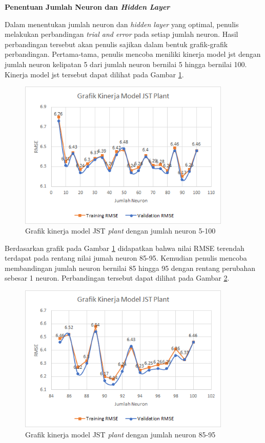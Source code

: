\noindent \textbf{Penentuan Jumlah Neuron dan \textit{Hidden Layer}}

Dalam menentukan jumlah neuron dan \textit{hidden layer} yang optimal, penulis melakukan perbandingan \textit{trial and error} pada setiap jumlah neuron. Hasil perbandingan tersebut akan penulis sajikan dalam bentuk grafik-grafik perbandingan. Pertama-tama, penulis mencoba meniliki kinerja model jst dengan jumlah neuron kelipatan 5 dari jumlah neuron bernilai 5 hingga bernilai 100. Kinerja model jst tersebut dapat dilihat pada Gambar \ref{fig:5:Neuron5-100}.
\begin{figure}[!h]
	\centering
	\includegraphics[width=0.9\textwidth]{figures/Neuron5-100}
	\caption{Grafik kinerja model JST \textit{plant} dengan jumlah neuron 5-100}
	\label{fig:5:Neuron5-100}
\end{figure}

Berdasarkan grafik pada Gambar \ref{fig:5:Neuron5-100} didapatkan bahwa nilai RMSE terendah terdapat pada rentang nilai jumah neuron 85-95. Kemudian penulis mencoba membandingan jumlah neuron bernilai 85 hingga 95 dengan rentang perubahan sebesar 1 neuron. Perbandingan tersebut dapat dilihat pada Gambar \ref{fig:5:Neuron85-95}.
\begin{figure}[!h]
	\centering
	\includegraphics[width=0.9\textwidth]{figures/Neuron85-95}
	\caption{Grafik kinerja model JST \textit{plant} dengan jumlah neuron 85-95}
	\label{fig:5:Neuron85-95}
\end{figure}

